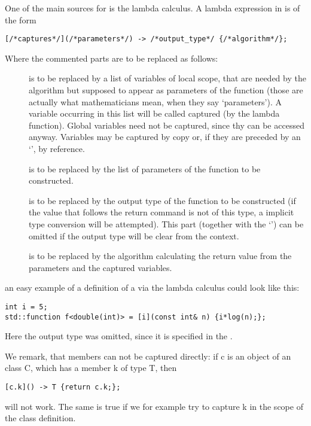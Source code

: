 One of the main sources for  is the \cc lambda calculus. A lambda expression in \cc is of the form
\begin{lstlisting}
[/*captures*/](/*parameters*/) -> /*output_type*/ {/*algorithm*/};
\end{lstlisting}
Where the commented parts are to be replaced as follows:
\begin{description}
\item[\textcolor{commentgray}{}] is to be replaced by a list of variables of local scope, that are needed by the algorithm but supposed to appear as parameters of the function (those are actually what mathematicians mean, when they say \lq parameters\rq). A variable occurring in this list will be called captured (by the lambda function). Global variables need not be captured, since thy can be accessed anyway. Variables may be captured by copy or, if they are preceded by an \lq\code{\&}\rq, by reference.
\item[\textcolor{commentgray}{}] is to be replaced by the list of parameters of the function to be constructed.
\item[\textcolor{commentgray}{}] is to be replaced by the output type of the function to be constructed (if the value that follows the return command is not of this type, a implicit type conversion will be attempted). This part (together with the \lq\code{->}\rq) can be omitted if the output type will be clear from the context.
\item[\textcolor{commentgray}{}] is to be replaced by the algorithm calculating the return value from the parameters and the captured variables.
\end{description}
an easy example of a definition of a  via the \cc lambda calculus could look like this:
\begin{lstlisting}
int i = 5;
std::function f<double(int)> = [i](const int& n) {i*log(n);};
\end{lstlisting}
Here the output type was omitted, since it is specified in the .

We remark, that members can not be captured directly: if \code c is an object of an class \code C, which has a member k of type T, then
\begin{lstlisting}
[c.k]() -> T {return c.k;};
\end{lstlisting}
will not work. The same is true if we for example try to capture \code k in the scope of the class definition.


